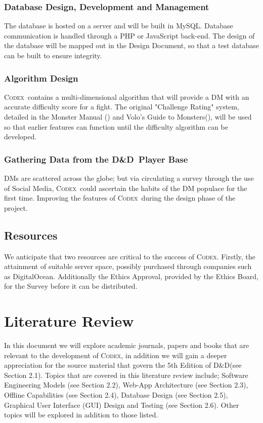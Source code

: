 \documentclass[review]{cmpreport}
\newcommand{\dnd}{D\&D}
\newcommand{\Codex}{\textsc{Codex}}
\begin{document}
	\subsubsection{Database Design, Development and Management}
	The database is hosted on a server and will be built in MySQL. Database communication is handled through a PHP or JavaScript back-end. The design of the database will be mapped out in the Design Document, so that a test database can be built to ensure integrity. 
	
	\subsubsection{Algorithm Design}
	\Codex \ contains a multi-dimensional algorithm that will provide a DM with an accurate difficulty score for a fight. The original "Challenge Rating" system, detailed in the Monster Manual (\cite{MonsterManual}) and Volo's Guide to Monsters(\cite{Volos}), will be used so that earlier features can function until the difficulty algorithm can be developed. 
	
	\subsubsection{Gathering Data from the \dnd \ Player Base}
	DMs are scattered across the globe; but via circulating a survey through the use of Social Media, \Codex \ could ascertain the habits of the DM populace for the first time. Improving the features of \Codex \ during the design phase of the project.
	
	\subsection{Resources}
	We anticipate that two resources are critical to the success of \Codex. Firstly, the attainment of suitable server space, possibly purchased through companies such as DigitalOcean. Additionally the Ethics Approval, provided by the Ethics Board, for the Survey before it can be distributed. 
	
	\clearpage
	
	\section{Literature Review}
	In this document we will explore academic journals, papers and books that are relevant to the development of \Codex, in addition we will gain a deeper appreciation for the source material that govern the 5th Edition of \dnd (see Section 2.1). Topics that are covered in this literature review include; Software Engineering Models (see Section 2.2), Web-App Architecture (see Section 2.3), Offline Capabilities (see Section 2.4), Database Design (see Section 2.5), Graphical User Interface (GUI) Design and Testing (see Section 2.6). Other topics will be explored in addition to those listed.
	
\end{document}
